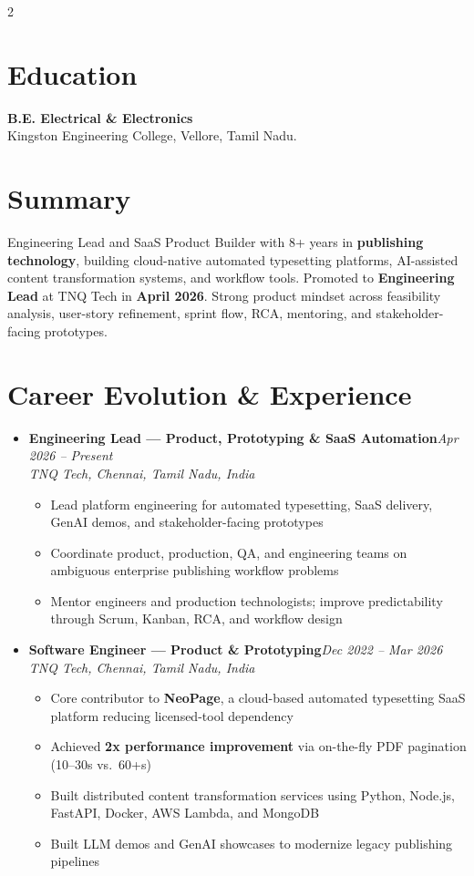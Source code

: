 \documentclass[10pt]{article}
\newcommand{\role}[2]{%
  \item {\fontsize{11.4pt}{13pt}\selectfont\textbf{#1}}\hfill\textit{#2}\\[-1pt]
}
\begin{document}
\begin{paracol}{2}
\section*{Education}
\textbf{B.E. Electrical \& Electronics}\\
Kingston Engineering College, Vellore, Tamil Nadu.

\switchcolumn

\section*{Summary}
Engineering Lead and SaaS Product Builder with 8+ years in \textbf{publishing technology}, building cloud-native automated typesetting platforms, AI-assisted content transformation systems, and workflow tools. Promoted to \textbf{Engineering Lead} at TNQ Tech in \textbf{April 2026}. Strong product mindset across feasibility analysis, user-story refinement, sprint flow, RCA, mentoring, and stakeholder-facing prototypes.

\section*{Career Evolution \& Experience}
\begin{itemize}[leftmargin=*, label={\textbullet}]

\role{Engineering Lead — Product, Prototyping \& SaaS Automation}{Apr 2026 -- Present}
\textit{TNQ Tech, Chennai, Tamil Nadu, India}
\begin{itemize}
  \item Lead platform engineering for automated typesetting, SaaS delivery, GenAI demos, and stakeholder-facing prototypes
  \item Coordinate product, production, QA, and engineering teams on ambiguous enterprise publishing workflow problems
  \item Mentor engineers and production technologists; improve predictability through Scrum, Kanban, RCA, and workflow design
\end{itemize}

\role{Software Engineer — Product \& Prototyping}{Dec 2022 -- Mar 2026}
\textit{TNQ Tech, Chennai, Tamil Nadu, India}
\begin{itemize}
  \item Core contributor to \textbf{NeoPage}, a cloud-based automated typesetting SaaS platform reducing licensed-tool dependency
  \item Achieved \textbf{2x performance improvement} via on-the-fly PDF pagination (10--30s vs.\ 60+s)
  \item Built distributed content transformation services using Python, Node.js, FastAPI, Docker, AWS Lambda, and MongoDB
  \item Built LLM demos and GenAI showcases to modernize legacy publishing pipelines
\end{itemize}


\end{itemize}
\end{paracol}
\end{document}
